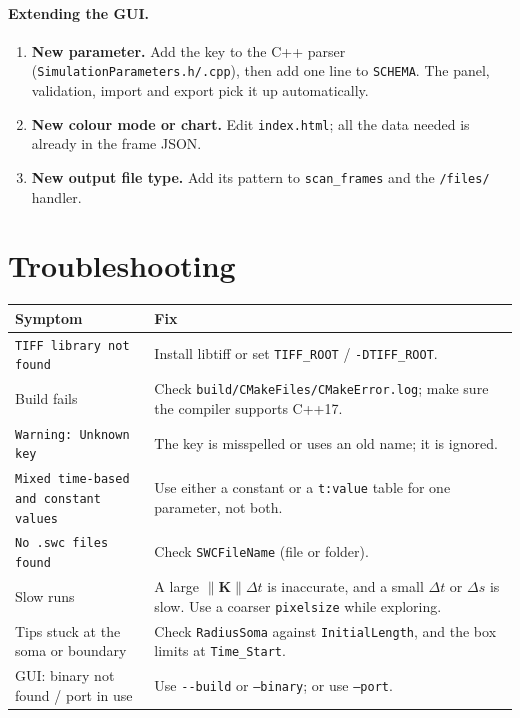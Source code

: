 \documentclass[11pt,a4paper]{article}
\newcommand{\code}[1]{\texttt{#1}}
\begin{document}
\paragraph{Extending the GUI.}
\begin{enumerate}
  \item \textbf{New parameter.} Add the key to the C++ parser (\code{SimulationParameters.h/.cpp}), then add one line to \code{SCHEMA}. The panel, validation, import and export pick it up automatically.
  \item \textbf{New colour mode or chart.} Edit \code{index.html}; all the data needed is already in the frame JSON.
  \item \textbf{New output file type.} Add its pattern to \code{scan\_frames} and the \code{/files/} handler.
\end{enumerate}

\section{Troubleshooting}
\begin{center}\small
\begin{tabularx}{\textwidth}{@{}p{5.2cm}X@{}}
\toprule
\textbf{Symptom} & \textbf{Fix}\\ \midrule
\code{TIFF library not found} & Install libtiff or set \code{TIFF\_ROOT} / \code{-DTIFF\_ROOT}.\\
Build fails & Check \code{build/CMakeFiles/CMakeError.log}; make sure the compiler supports C++17.\\
\code{Warning: Unknown key} & The key is misspelled or uses an old name; it is ignored.\\
\code{Mixed time-based and constant values} & Use either a constant or a \code{t:value} table for one parameter, not both.\\
\code{No .swc files found} & Check \code{SWCFileName} (file or folder).\\
Slow runs & A large $\lVert\mathbf K\rVert\Delta t$ is inaccurate, and a small $\Delta t$ or $\Delta s$ is slow. Use a coarser \code{pixelsize} while exploring.\\
Tips stuck at the soma or boundary & Check \code{RadiusSoma} against \code{InitialLength}, and the box limits at \code{Time\_Start}.\\
GUI: binary not found / port in use & Use \code{-{}-build} or \code{--binary}; or use \code{--port}.\\
\bottomrule
\end{tabularx}
\end{center}
\end{document}
